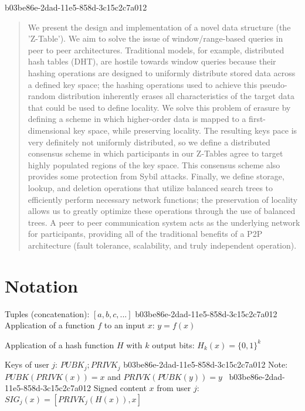 \documentclass[12pt]{article}
\begin{document}
\maketitle
b03be86e-2dad-11e5-858d-3c15c2c7a012
\begin{abstract}
We present the design and implementation of a novel data structure (the 'Z-Table'). We aim to solve the issue of window/range-based queries in peer to peer architectures. Traditional models, for example,  distributed hash tables (DHT), are hostile towards window queries because their hashing operations are designed to uniformly distribute stored data across a defined key space; the hashing operations used to achieve this pseudo-random distribution inherently erases all characteristics of the target data that could be used to define locality. We solve this problem of erasure by defining a scheme in which higher-order data is mapped to a first-dimensional key space, while preserving locality. The resulting keys pace is very definitely not uniformly distributed, so we define a distributed consensus scheme in which participants in our Z-Tables agree to target highly populated regions of the key space. This consensus scheme also provides some protection from Sybil attacks. Finally, we define storage, lookup, and deletion operations that utilize balanced search trees to efficiently perform necessary network functions; the preservation of locality allows us to greatly optimize these operations through the use of balanced trees. A peer to peer communication system acts as the underlying network for participants, providing all of the traditional benefits of a P2P architecture (fault tolerance, scalability, and truly independent operation).
\end{abstract}

\section{Notation}

Tuples (concatenation): $[a,b,c,...]$
b03be86e-2dad-11e5-858d-3c15c2c7a012
Application of a function $f$ to an input $x$: $y=f(x)$

Application of a hash function $H$ with $k$ output bits: $H_{k}(x) = \{0,1\}^k$

Keys of user $j$: $ PUBK_j; PRIVK_j $
b03be86e-2dad-11e5-858d-3c15c2c7a012
Note: $PUBK(PRIVK(x)) = x$ and $PRIVK(PUBK(y)) = y$~
b03be86e-2dad-11e5-858d-3c15c2c7a012
Signed content $x$ from user $j$: $SIG_j(x) = \left[ PRIVK_j( H(x) ), x \right]$
\end{document}
